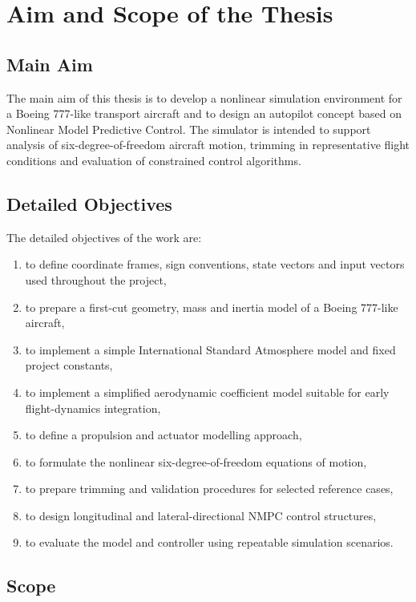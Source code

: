 \chapter{Aim and Scope of the Thesis}

\section{Main Aim}

The main aim of this thesis is to develop a nonlinear simulation environment for a Boeing 777-like transport aircraft and to design an autopilot concept based on Nonlinear Model Predictive Control. The simulator is intended to support analysis of six-degree-of-freedom aircraft motion, trimming in representative flight conditions and evaluation of constrained control algorithms.

\section{Detailed Objectives}

The detailed objectives of the work are:
\begin{enumerate}
    \item to define coordinate frames, sign conventions, state vectors and input vectors used throughout the project,
    \item to prepare a first-cut geometry, mass and inertia model of a Boeing 777-like aircraft,
    \item to implement a simple International Standard Atmosphere model and fixed project constants,
    \item to implement a simplified aerodynamic coefficient model suitable for early flight-dynamics integration,
    \item to define a propulsion and actuator modelling approach,
    \item to formulate the nonlinear six-degree-of-freedom equations of motion,
    \item to prepare trimming and validation procedures for selected reference cases,
    \item to design longitudinal and lateral-directional NMPC control structures,
    \item to evaluate the model and controller using repeatable simulation scenarios.
\end{enumerate}

\section{Scope}

